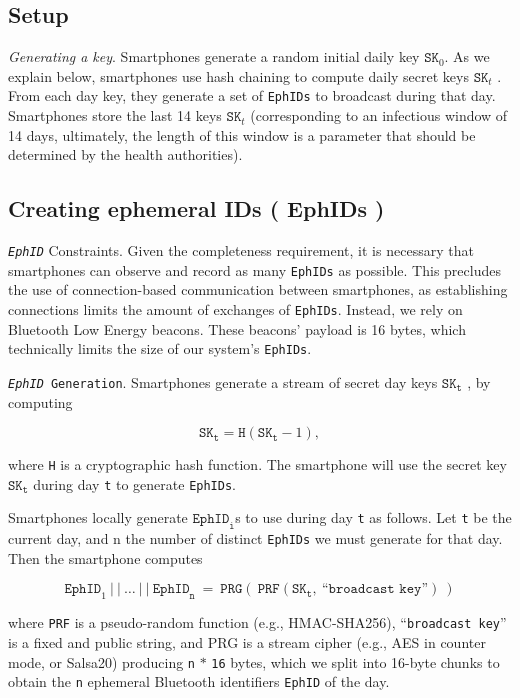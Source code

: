 \documentclass[12pt,a4paper]{article}
\begin{document}
\subsection*{Setup}
\textit{Generating a key}. Smartphones generate a random initial daily key $\texttt{SK}_0$. As we explain below, smartphones use hash chaining to compute daily secret keys $\texttt{SK}_t$ . From each day key, they generate a set of \texttt{EphIDs} to broadcast during that day. Smartphones store the last 14 keys $\texttt{SK}_t$ (corresponding to an infectious window of 14 days, ultimately, the length of this window is a parameter that should be determined by the health authorities).
\subsection*{Creating ephemeral IDs ( EphIDs )}
\texttt{\textit{EphID}} Constraints. Given the completeness requirement, it is necessary that smartphones can observe and record as many \texttt{EphIDs} as possible. This precludes the use of connection-based communication between smartphones, as establishing connections limits the amount of exchanges of \texttt{EphIDs}. Instead, we rely on Bluetooth Low Energy beacons. These beacons’ payload is 16 bytes, which technically limits the size of our system’s \texttt{EphIDs}.

\texttt{\textit{EphID} Generation}. Smartphones generate a stream of secret day keys $\texttt{SK}_\texttt{t}$ , by computing

\[\texttt{SK}_\texttt{t}  = \texttt{H}(\texttt{SK}_\texttt{t} - 1) ,\]

where \texttt{H} is a cryptographic hash function. The smartphone will use the secret key $\texttt{SK}_\texttt{t}$ during day \texttt{t}  to generate \texttt{EphIDs}.

Smartphones locally generate $\texttt{EphID}_\texttt{i}$s to use during day \texttt{t} as follows. Let \texttt{t} be the current day, and n the number of distinct \texttt{EphIDs} we must generate for that day. Then the smartphone computes

\[\texttt{EphID}_1\  \vert\ \vert\ \ldots\ \vert\ \vert\ \texttt{EphID}_\texttt{n}\ =\ \texttt{PRG} (\ \texttt{PRF}(\texttt{SK}_\texttt{t} ,\ “\texttt{broadcast key}”)\ )\]


where \texttt{PRF} is a pseudo-random function (e.g., HMAC-SHA256), “\texttt{broadcast key}” is a fixed and public string, and PRG is a stream cipher (e.g., AES in counter mode, or Salsa20) producing \texttt{n} $\ast$ \texttt{16} bytes, which we split into 16-byte chunks to obtain the \texttt{n} ephemeral Bluetooth identifiers \texttt{EphID} of the day.
\end{document}
